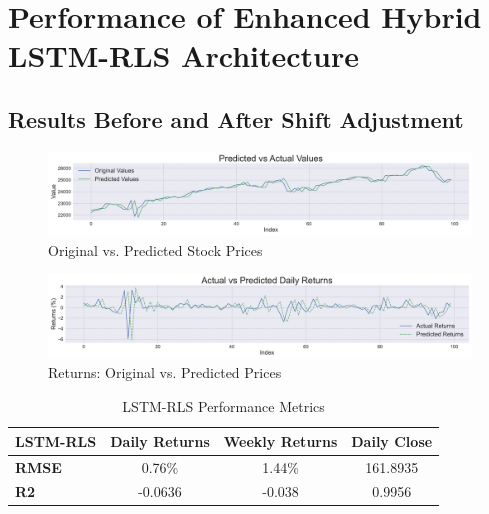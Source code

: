 \section{Performance of Enhanced Hybrid LSTM-RLS Architecture}

\subsection{Results Before and After Shift Adjustment}

\begin{figure}[h!]
    \centering
    \includegraphics[width=\textwidth]{Images/ActvsPred.pdf}
    \caption{Original vs. Predicted Stock Prices}
    \label{fig:refinedApproachRes1}
\end{figure}

\begin{figure}[h!]
    \centering
    \includegraphics[width=\textwidth]{Images/returns_comparision.pdf}
    \caption{Returns: Original vs. Predicted Prices}
    \label{fig:refinedApproachRes2}
\end{figure}

\begin{table}[h!]
\centering
\caption{LSTM-RLS Performance Metrics}
\begin{tabular}{|l|c|c|c|}
\hline
\textbf{LSTM-RLS}  & \textbf{Daily Returns} & \textbf{Weekly Returns} & \textbf{Daily Close} \\ \hline
\textbf{RMSE}      & 0.76\%                 & 1.44\%                 & 161.8935             \\ \hline
\textbf{R2}        & -0.0636                & -0.038                 & 0.9956               \\ \hline
\end{tabular}

\label{tab:lstm_rls_performance}
\end{table}

